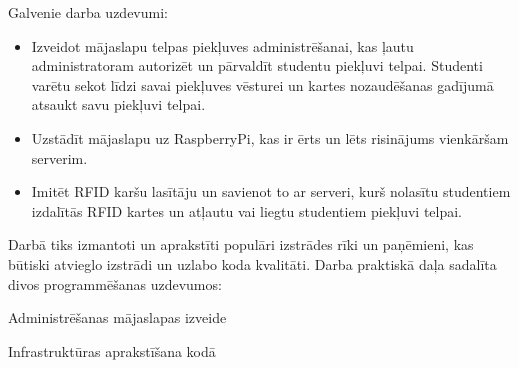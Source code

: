 Galvenie darba uzdevumi:
\begin{itemize}
  \item Izveidot mājaslapu telpas piekļuves administrēšanai, kas ļautu administratoram autorizēt un pārvaldīt studentu piekļuvi telpai. Studenti varētu sekot līdzi savai piekļuves vēsturei un kartes nozaudēšanas gadījumā atsaukt savu piekļuvi telpai.
  \item Uzstādīt mājaslapu uz RaspberryPi, kas ir ērts un lēts risinājums vienkāršam serverim.
  \item Imitēt RFID karšu lasītāju un savienot to ar serveri, kurš nolasītu studentiem izdalītās RFID kartes un atļautu vai liegtu studentiem piekļuvi telpai.
\end{itemize}

Darbā tiks izmantoti un aprakstīti populāri izstrādes rīki un paņēmieni, kas būtiski atvieglo izstrādi un uzlabo koda kvalitāti.
Darba praktiskā daļa sadalīta divos programmēšanas uzdevumos:
\begin{env}
  \item Administrēšanas mājaslapas izveide
  \item Infrastruktūras aprakstīšana kodā
\end{env}



